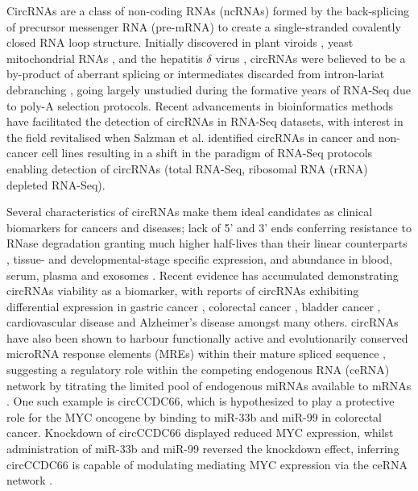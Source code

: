 CircRNAs are a class of non-coding RNAs (ncRNAs) formed by the back-splicing of precursor messenger RNA (pre-mRNA) to create a single-stranded covalently closed RNA loop structure. Initially discovered in plant viroids \cite{Sanger1976}, yeast mitochondrial RNAs \cite{Arnberg1980Feb}, and the hepatitis $\delta$ virus \cite{Kos1986Oct}, circRNAs were believed to be a by-product of aberrant splicing or intermediates discarded from intron-lariat debranching \cite{Cocquerelle1993Jan,Qian1992}, going largely unstudied during the formative years of RNA-Seq due to poly-A selection protocols. Recent advancements in bioinformatics methods have facilitated the detection of circRNAs in RNA-Seq datasets, with interest in the field revitalised when Salzman et al. identified circRNAs in cancer and non-cancer cell lines \cite{Salzman2012} resulting in a shift in the paradigm of RNA-Seq protocols enabling detection of circRNAs (total RNA-Seq, ribosomal RNA (rRNA) depleted RNA-Seq). \par
Several characteristics of circRNAs make them ideal candidates as clinical biomarkers for cancers and diseases; lack of 5' and 3' ends conferring resistance to RNase degradation granting much higher half-lives than their linear counterparts \cite{Salzman2012,findcirc}, tissue- and developmental-stage specific expression, and abundance in blood, serum, plasma and exosomes \cite{Memczak2015, Bahn2015}. Recent evidence has accumulated demonstrating circRNAs viability as a biomarker, with reports of circRNAs exhibiting differential expression in gastric cancer \cite{Li2015Apr}, colorectal cancer \cite{Bachmayr-Heyda2015}, bladder cancer \cite{Zhong2016}, cardiovascular disease \cite{Tan2016} and Alzheimer's disease \cite{Panda2017} amongst many others. circRNAs have also been shown to harbour functionally active and evolutionarily conserved microRNA response elements (MREs) within their mature spliced sequence \cite{Hansen2013Mar,Thomas2014Aug}, suggesting a regulatory role within the competing endogenous RNA (ceRNA) network by titrating the limited pool of endogenous miRNAs available to mRNAs \cite{Denzler2014Jun}. One such example is circCCDC66, which is hypothesized to play a protective role for the MYC oncogene by binding to miR-33b and miR-99 in colorectal cancer. Knockdown of circCCDC66 displayed reduced MYC expression, whilst administration of miR-33b and miR-99 reversed the knockdown effect, inferring circCCDC66 is capable of modulating mediating MYC expression via the ceRNA network \cite{Hsiao2017}.
\par
